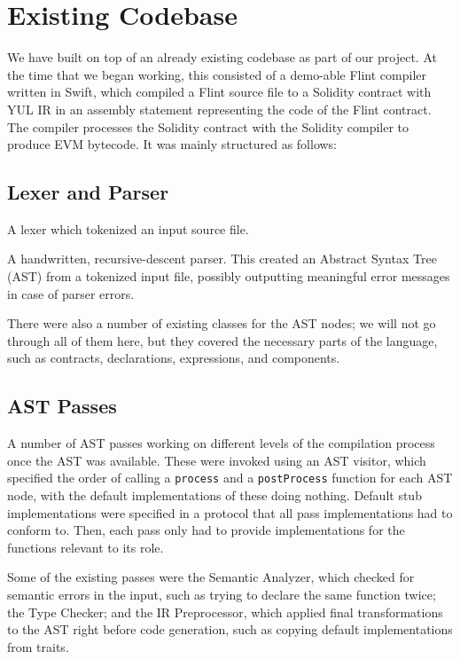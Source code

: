 \section{Existing Codebase}

We have built on top of an already existing codebase as part of our project. At the time that we began working, this consisted of a demo-able Flint compiler written in Swift, which compiled a Flint source file to a Solidity contract with YUL IR in an assembly statement representing the code of the Flint contract. The compiler processes the Solidity contract with the Solidity compiler to produce EVM bytecode. It was mainly structured as follows:

\subsection{Lexer and Parser}

A lexer which tokenized an input source file.

A handwritten, recursive-descent parser. This created an Abstract Syntax Tree (AST) from a tokenized input file, possibly outputting meaningful error messages in case of parser errors.

There were also a number of existing classes for the AST nodes; we will not go through all of them here, but they covered the necessary parts of the language, such as contracts, declarations, expressions, and components.

\subsection{AST Passes}

A number of AST passes working on different levels of the compilation process once the AST was available. These were invoked using an AST visitor, which specified the order of calling a \texttt{process} and a \texttt{postProcess} function for each AST node, with the default implementations of these doing nothing. Default stub implementations were specified in a protocol that all pass implementations had to conform to. Then, each pass only had to provide implementations for the functions relevant to its role.

Some of the existing passes were the Semantic Analyzer, which checked for semantic errors in the input, such as trying to declare the same function twice; the Type Checker; and the IR Preprocessor, which applied final transformations to the AST right before code generation, such as copying default implementations from traits. 

